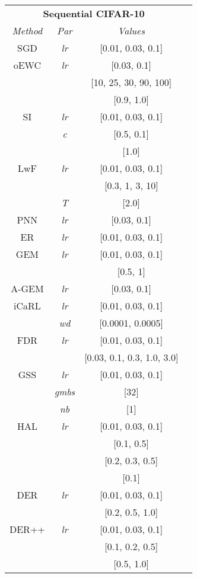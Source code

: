 \documentclass{article}
\begin{document}
{\begin{table}[H]
\begin{multicols}{3}
\begin{tabular}{cccc}
\toprule
\multicolumn{3}{c}{\textbf{Sequential CIFAR-10}}\\
\textit{Method} & \textit{Par} &
\textit{Values} \\
\midrule
SGD  & \textit{lr} & [0.01, 0.03, 0.1] \\
\midrule
oEWC & \textit{lr} & [0.03, 0.1] \\
& \textit{} & [10, 25, 30, 90, 100]\\
& \textit{} & [0.9, 1.0] \\
\midrule
SI   & \textit{lr} & [0.01, 0.03, 0.1] \\
& \textit{c} & [0.5, 0.1] \\
& \textit{} & [1.0] \\
\midrule
LwF  & \textit{lr} & [0.01, 0.03, 0.1] \\
& \textit{} & [0.3, 1, 3, 10] \\
& \textit{T} & [2.0] \\
\midrule
PNN  & \textit{lr} & [0.03, 0.1] \\
\midrule
ER  & \textit{lr} & [0.01, 0.03, 0.1] \\
\midrule
GEM  & \textit{lr} & [0.01, 0.03, 0.1] \\
& \textit{} & [0.5, 1]\\
\midrule
A-GEM & \textit{lr} & [0.03, 0.1] \\
\midrule
iCaRL & \textit{lr} & [0.01, 0.03, 0.1] \\
& \textit{wd} & [0.0001, 0.0005] \\
\midrule
FDR  & \textit{lr} & [0.01, 0.03, 0.1] \\
& \textit{} & [0.03, 0.1, 0.3, 1.0, 3.0] \\
\midrule
GSS  & \textit{lr} & [0.01, 0.03, 0.1] \\
& \textit{gmbs} & [32] \\
& \textit{nb} & [1] \\
\midrule
HAL   & \textit{lr} & [0.01, 0.03, 0.1] \\
& 	  \textit{} & [0.1, 0.5] \\
& 	  \textit{} & [0.2, 0.3, 0.5] \\
& 	  \textit{} & [0.1] \\
\midrule
DER  & \textit{lr} & [0.01, 0.03, 0.1] \\
& \textit{} & [0.2, 0.5, 1.0] \\
\midrule
DER++ & \textit{lr} & [0.01, 0.03, 0.1] \\
& \textit{} & [0.1, 0.2, 0.5] \\
& \textit{} & [0.5, 1.0] \\
\bottomrule
\end{tabular}



\end{multicols}
\end{table}}
\end{document}
